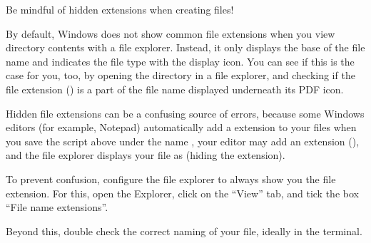 \ignorespaces \begin{windowswit}[label={ww-filename-extensions}, before title={\thetcbcounter\ }, float, floatplacement=tb, check odd page=true]{Be mindful of hidden extensions when creating files!}
\label{\detokenize{basics/101-108-run:ww-filename-extensions}}

\sphinxAtStartPar
By default, Windows does not show common file extensions when you view directory contents with a file explorer.
Instead, it only displays the base of the file name and indicates the file type with the display icon.
You can see if this is the case for you, too, by opening the  directory in a file explorer, and checking if the file extension () is a part of the file name displayed underneath its PDF icon.

\sphinxAtStartPar
Hidden file extensions can be a confusing source of errors, because some Windows editors (for example, Notepad) automatically add a  extension to your files \textendash{} when you save the script above under the name , your editor may add an extension (), and the file explorer displays your file as  (hiding the  extension).

\sphinxAtStartPar
To prevent confusion, configure the file explorer to always show you the file extension.
For this, open the Explorer, click on the “View” tab, and tick the box “File name extensions”.

\sphinxAtStartPar
Beyond this, double check the correct naming of your file, ideally in the terminal.


\end{windowswit}

